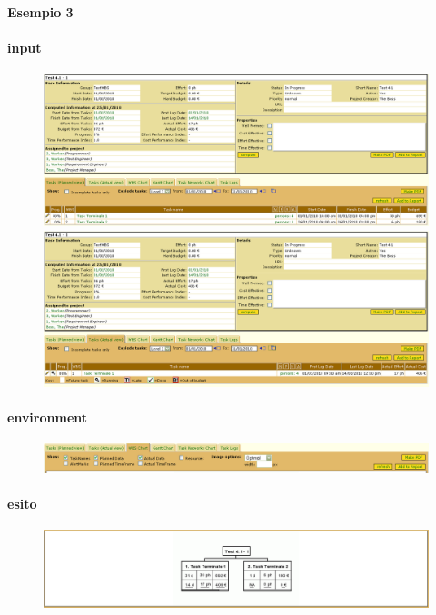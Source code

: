 \paragraph{Esempio 3}
\paragraph{input}
\begin{figure}
\centering
\includegraphics[width=\textwidth]{tests/TEST_WBS/4.1/4.1_1/Esempio_3/input.png}
\includegraphics[width=\textwidth]{tests/TEST_WBS/4.1/4.1_1/Esempio_3/input_actual.png}
\end{figure}
\paragraph{environment}
\begin{figure}
\centering
\includegraphics[width=\textwidth]{tests/TEST_WBS/4.1/4.1_1/Esempio_3/environment.png}
\end{figure}
\paragraph{esito}
\begin{figure}
\centering
\includegraphics[width=\textwidth]{tests/TEST_WBS/4.1/4.1_1/Esempio_3/output.png}
\end{figure}


